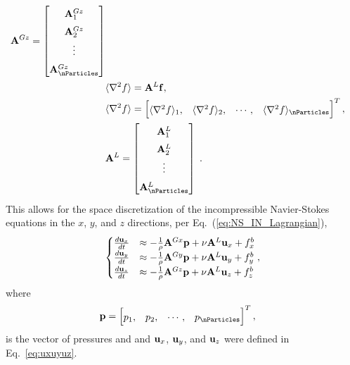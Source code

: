 \begin{align}
\mathbf{A}^{Gz}= \begin{bmatrix}
\mathbf{A}^{Gz}_1\\\mathbf{A}^{Gz}_2\\\vdots\\\mathbf{A}^{Gz}_{\nParticles}
\end{bmatrix}\\
&\langle \nabla^2 f \rangle=\mathbf{A}^L\mathbf{f},\label{eq:laplace_op}\\
&\langle \nabla^2 f \rangle= \begin{bmatrix}
\langle \nabla^2 f \rangle_1,&\langle \nabla^2 f \rangle_2,&\cdots,&\langle \nabla^2 f \rangle_{\nParticles}
\end{bmatrix}^T,\\
&\mathbf{A}^L=  \renewcommand*{\arraystretch}{1.5}
\begin{bmatrix}
\mathbf{A}^L_1\\\mathbf{A}^L_2\\\vdots\\\mathbf{A}^L_{\nParticles}
\end{bmatrix} \; .
\end{align}
This allows for the space discretization of the incompressible Navier-Stokes equations in the $x$, $y$, and $z$ directions, per Eq.~(\ref{eq:NS_IN_Lagrangian}),
\begin{align}
\begin{cases}
\frac{d{\bf u}_x}{dt} & \approx -\frac{1}{\rho} \mathbf{A}^{Gx}\mathbf{p} + \nu \mathbf{A}^L{\bf u}_x+{ f}_x^b\\
\frac{d{\bf u}_y}{dt} & \approx -\frac{1}{\rho} \mathbf{A}^{Gy}\mathbf{p} + \nu \mathbf{A}^L{\bf u}_y+{ f}_y^b\\
\frac{d{\bf u}_z}{dt} & \approx -\frac{1}{\rho} \mathbf{A}^{Gz}\mathbf{p} + \nu \mathbf{A}^L{\bf u}_z+{ f}_z^b
\end{cases}\label{eq:NS_discretized},
\end{align}
where 
\begin{align}
&\mathbf{p}= \begin{bmatrix}
p_{1},&p_{2},&\cdots,&p_{\nParticles}
\end{bmatrix}^T,\label{eq:pres_vec}
\end{align} 
is the vector of pressures and 
and ${\bf u}_x$, ${\bf u}_y$, and ${\bf u}_z$ were defined in Eq.~\ref{eq:uxuyuz}.


